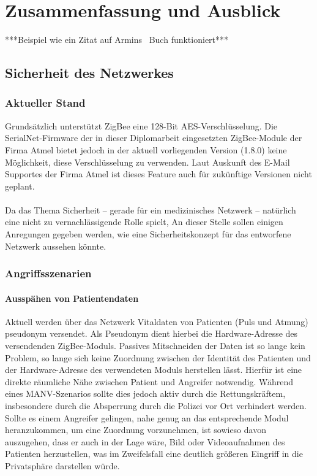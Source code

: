 
\chapter{Zusammenfassung und Ausblick}
***Beispiel wie ein Zitat auf Armins~\citep{Bolz} Buch funktioniert***

\section{Sicherheit des Netzwerkes}
\subsection{Aktueller Stand}
Grundsätzlich unterstützt ZigBee eine 128-Bit AES-Verschlüsselung. Die SerialNet-Firmware der in dieser Diplomarbeit
eingesetzten ZigBee-Module der Firma Atmel bietet jedoch in der aktuell vorliegenden Version (1.8.0) keine Möglichkeit,
diese Verschlüsselung zu verwenden. Laut Auskunft des E-Mail Supportes der Firma Atmel ist dieses Feature auch für
zukünftige Versionen nicht geplant.\\
\\
Da das Thema Sicherheit -- gerade für ein medizinisches Netzwerk -- natürlich eine nicht zu vernachlässigende Rolle spielt,
An dieser Stelle sollen einigen Anregungen gegeben werden, wie eine Sicherheitskonzept für das entworfene Netzwerk aussehen 
könnte.

\subsection{Angriffsszenarien}

\subsubsection{Ausspähen von Patientendaten}
Aktuell werden über das Netzwerk Vitaldaten von Patienten (Puls und Atmung) pseudonym versendet. Als Pseudonym dient 
hierbei die Hardware-Adresse des versendenden ZigBee-Moduls. Passives Mitschneiden der Daten ist so lange kein Problem,
so lange sich keine Zuordnung zwischen der Identität des Patienten und der Hardware-Adresse des verwendeten Moduls
herstellen lässt. Hierfür ist eine direkte räumliche Nähe zwischen Patient und Angreifer notwendig. 
Während eines MANV-Szenarios sollte dies jedoch aktiv durch die Rettungskräftem, insbesondere durch die Absperrung durch
die Polizei vor Ort verhindert werden. Sollte es einem Angreifer gelingen, nahe genug an das entsprechende Modul
heranzukommen, um eine Zuordnung vorzunehmen, ist sowieso davon auszugehen, dass er auch in der Lage wäre, Bild oder
Videoaufnahmen des Patienten herzustellen, was im Zweifelsfall eine deutlich größeren Eingriff in die Privatsphäre 
darstellen würde.

